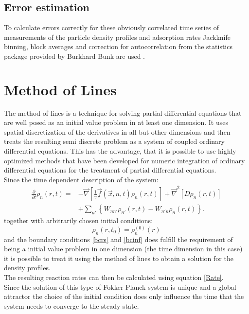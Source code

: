 \subsection{Error estimation}
To calculate errors correctly for these obviously correlated time series of measurements of the particle density profiles and adsorption rates Jackknife binning, block averages and correction for autocorrelation from the statistics package provided by Burkhard Bunk are used \cite{bunk2006}.
\section{Method of Lines}
\label{method_of_lines}
The method of lines \cite{pregla1989, saucez2001} is a technique for solving partial differential equations that are well posed as an initial value problem in at least one dimension. It uses spatial discretization of the derivatives in all but other dimensions and then treats the resulting semi discrete problem as a system of coupled ordinary differential equations. This has the advantage, that it is possible to use highly optimized methods that have been developed for numeric integration of ordinary differential equations for the treatment of partial differential equations.\\
Since the time dependent description of the system: 
\begin{align}
    \frac{\partial}{\partial t } \rho_n(r,t) =   &- \vec{ \nabla } \left[\frac{1}{\gamma}\vec{f}(\vec{x},n,t)\rho_n(r,t) \right] +\vec{\nabla}^{2}\left[ D\rho_n(r,t) \right] \nonumber \\
    &+ \sum_{n'} \left\{ W_{nn'}\rho_{n'}(r,t) - W_{n'n}\rho_n(r,t)\right\}.
    \label{fpmeqmol}
\end{align}
together with arbitrarily chosen initial conditions:
\begin{equation}
    \rho_n(r,t_0) = \rho_n^{(0)}(r)
    \label{rho0mol}
\end{equation}
and the boundary conditions \eqref{bcrs} and \eqref{bcinf} does fulfill the requirement of being a initial value problem in one dimension (the time dimension in this case) it is possible to treat it using the method of lines to obtain a solution for the density profiles.\\
The resulting reaction rates can then be calculated using equation \eqref{Rate}.\\
Since the solution of this type of Fokker-Planck system is unique \cite{soize1994} and a global attractor \cite{Efendiev2000} the choice of the initial condition does only influence the time that the system needs to converge to the steady state.\\
